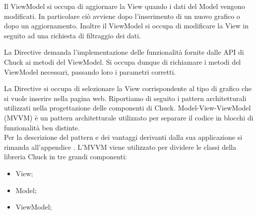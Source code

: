 			Il ViewModel si occupa di aggiornare la View quando i dati del Model vengono modificati. In particolare ciò avviene dopo l'inserimento di un nuovo grafico o dopo un aggiornamento. Inoltre il ViewModel si occupa di modificare la View in seguito ad una richiesta di filtraggio dei dati.
				
			La Directive demanda l'implementazione delle funzionalità fornite dalle API di Chuck ai metodi del ViewModel. Si occupa dunque di richiamare i metodi del ViewModel necessari, passando loro i parametri corretti.
			
			La Directive si occupa di selezionare la View corrispondente al tipo di grafico che si vuole inserire nella pagina web.
		Riportiamo di seguito i pattern architetturali utilizzati nella progettazione delle componenti di Chuck.
			Model-View-ViewModel (MVVM) è un pattern architetturale utilizzato per separare il codice in blocchi di funzionalità ben distinte.\\
			Per la descrizione del pattern e dei vantaggi derivanti dalla sua applicazione si rimanda all'appendice .
				L'MVVM viene utilizzato per dividere le classi della libreria Chuck in tre grandi componenti:
				\begin{itemize}
					\item View;
					\item Model;
					\item ViewModel;
				\end{itemize}
	
